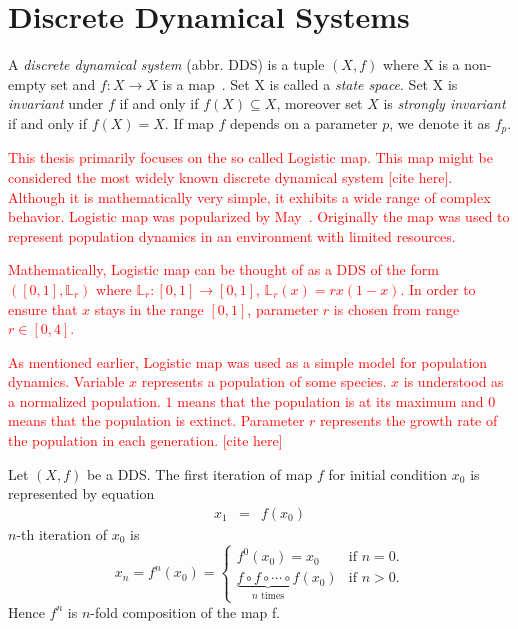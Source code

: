 \section{Discrete Dynamical Systems}

\begin{definition}
    A \emph{discrete dynamical system} (abbr. DDS) is a tuple $\left( X, f \right)$ where X is a non-empty set and $f: X \rightarrow X$ is a map~\cite{Brin20100706}.
    Set X is called a \emph{state space}.
    Set X is \emph{invariant} under $f$ if and only if $f(X) \subseteq X$, moreover set $X$ is \emph{strongly invariant} if and only if $f(X) = X$.
    If map $f$ depends on a parameter $p$, we denote it as $f_p$.
\end{definition}

\begin{remark}
    \textcolor{red}{
    This thesis primarily focuses on the so called Logistic map.
    This map might be considered the most widely known discrete dynamical system [cite here].
    Although it is mathematically very simple, it exhibits a wide range of complex behavior.
    Logistic map was popularized by May~\cite{May19760610}.
    Originally the map was used to represent population dynamics in an environment with limited resources.
    }
    \par
    \textcolor{red}{
    Mathematically, Logistic map can be thought of as a DDS of the form $\left( [0, 1], \mathbb{L}_{r} \right)$ where $\mathbb{L}_{r}: [0,1] \rightarrow [0,1]$, $\mathbb{L}_{r}(x) = rx(1-x)$.
    In order to ensure that $x$ stays in the range $[0,1]$, parameter $r$ is chosen from range $r \in [0, 4]$.
    }
    \par
    \textcolor{red}{
    As mentioned earlier, Logistic map was used as a simple model for population dynamics.
    Variable $x$ represents a population of some species.
    $x$ is understood as a normalized population.
    $1$ means that the population is at its maximum and $0$ means that the population is extinct.
    Parameter $r$ represents the growth rate of the population in each generation. [cite here]
    }
\end{remark}

\begin{definition}
    Let $\left( X, f \right)$ be a DDS. 
    The first iteration of map $f$ for initial condition $x_0$ is represented by equation
    \begin{eqnarray}
        x_{1}  & = & f(x_{0})
    \end{eqnarray}
    $n$-th iteration of $x_0$ is
    \begin{equation}
    x_{n} = f^{n}(x_0) =
        \begin{cases}
            f^{0}(x_0) = x_0 & \text{if } n = 0. \\
            \underbrace{f \circ f \circ \cdots \circ f}_\text{$n$ times}(x_0) & \text{if } n > 0. 
        \end{cases}
    \end{equation}
    Hence $f^{n}$ is $n$-fold composition of the map f.
\end{definition}

